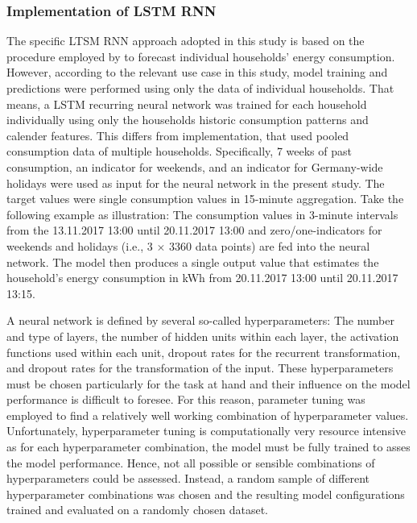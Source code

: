 \subsubsection{Implementation of LSTM RNN}

The specific LTSM RNN approach adopted in this study is based on the procedure employed by \citet{Shi:2017} to forecast individual households' energy consumption. However, according to the relevant use case in this study, model training and predictions were performed using only the data of individual households. That means, a LSTM recurring neural network was trained for each household individually using only the households historic consumption patterns and calender features. This differs from \cites{Shi:2017} implementation, that used pooled consumption data of multiple households. Specifically, 7 weeks of past consumption, an indicator for weekends, and an indicator for Germany-wide holidays were used as input for the neural network in the present study. The target values were single consumption values in 15-minute aggregation. Take the following example as illustration: The consumption values in 3-minute intervals from the 13.11.2017 13:00 until 20.11.2017 13:00 and zero/one-indicators for weekends and holidays (i.e., 3 $\times$ 3360 data points) are fed into the neural network. The model then produces a single output value that estimates the household's energy consumption in kWh from 20.11.2017 13:00 until 20.11.2017 13:15.

A neural network is defined by several so-called hyperparameters: The number and type of layers, the number of hidden units within each layer, the activation functions used within each unit, dropout rates for the recurrent transformation, and dropout rates for the transformation of the input. These hyperparameters must be chosen particularly for the task at hand and their influence on the model performance is difficult to foresee. For this reason, parameter tuning was employed to find a relatively well working combination of hyperparameter values. Unfortunately, hyperparameter tuning is computationally very resource intensive as for each hyperparameter combination, the model must be fully trained to asses the model performance. Hence, not all possible or sensible combinations of hyperparameters could be assessed. Instead, a random sample of different hyperparameter combinations was chosen and the resulting model configurations trained and evaluated on a randomly chosen dataset.

